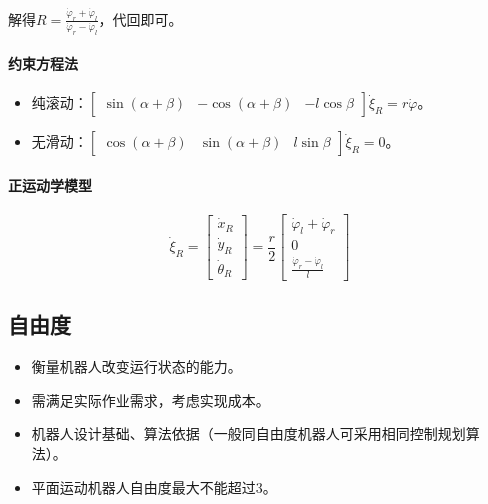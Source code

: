 \documentclass[
12pt, %
a4paper, 
oneside, %
headinclude,footinclude, %
]{scrartcl}
\begin{document}
解得$ R = \frac{\dot{\varphi}_r + \dot{\varphi}_l}{\dot{\varphi}_r - \dot{\varphi}_l} $，代回即可。
\paragraph{约束方程法}
\begin{itemize}
\item 纯滚动：$ \begin{bmatrix} \sin(\alpha + \beta) & -\cos(\alpha + \beta) & -l\cos\beta \end{bmatrix} \dot{\xi}_R = r\dot{\varphi} $。
\item 无滑动：$ \begin{bmatrix} \cos(\alpha + \beta) & \sin(\alpha + \beta) & l\sin\beta \end{bmatrix} \dot{\xi}_R = 0 $。
\end{itemize}
\paragraph{正运动学模型}
$$ \dot{\xi}_R = \begin{bmatrix} \dot{x}_R \\ \dot{y}_R \\ \dot{\theta}_R \end{bmatrix} = \frac{r}{2} \begin{bmatrix} \dot{\varphi}_l + \dot{\varphi}_r \\ 0 \\ \frac{\dot{\varphi}_r - \dot{\varphi}_l}{l} \end{bmatrix} $$
\subsection[自由度]{自由度}
\begin{itemize}
\item 衡量机器人改变运行状态的能力。
\item 需满足实际作业需求，考虑实现成本。
\item 机器人设计基础、算法依据（一般同自由度机器人可采用相同控制规划算法）。
\item 平面运动机器人自由度最大不能超过$ 3 $。
\end{itemize}
\end{document}

